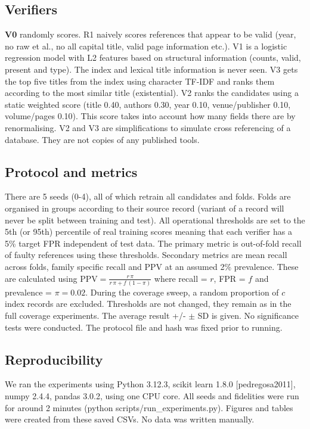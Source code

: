 \subsection{Verifiers}
\textbf{V0} randomly scores. R1 naively scores references that appear to be valid (year, no raw et al., no all capital title,
valid page information etc.). V1 is a logistic regression model with \NnFeat{} L2 features based on structural
information (counts, valid, present and type). The index and lexical title information is never seen. V3 gets the
top five titles from the index using character TF-IDF and ranks them according to the most similar title (existential). V2 ranks the
candidates using a static weighted score (title 0.40, authors 0.30, year 0.10, venue/publisher 0.10, volume/pages 0.10). This score takes
into account how many fields there are by renormalising. V2 and V3 are simplifications to simulate cross referencing of a database. They are
not copies of any published tools.

\subsection{Protocol and metrics}\label{sec:protocol}
There are 5 seeds (0-4), all of which retrain all candidates and folds. Folds are organised in groups according to their source
record (variant of a record will never be split between training and test). All operational thresholds are set to the 5th (or 95th)
percentile of real training scores meaning that each verifier has a 5\% target FPR independent of test data. The primary metric is
out-of-fold recall of faulty references using these thresholds. Secondary metrics are mean recall across folds, family specific
recall and PPV at an assumed 2\% prevalence. These are calculated using $\mathrm{PPV}=\frac{r\,\pi}{r\,\pi+f\,(1-\pi)}$ where recall = $r$,
FPR = $f$ and prevalence = $\pi{=}0.02$. During the coverage sweep, a random proportion of $c$
index records are excluded. Thresholds are not changed, they remain as in the full coverage experiments. The average result +/- $\pm$
SD is given. No significance tests were conducted. The protocol file and hash was fixed prior to running.

\subsection{Reproducibility}
We ran the experiments using Python 3.12.3, scikit learn 1.8.0 [pedregosa2011], numpy 2.4.4, pandas 3.0.2, using one CPU core. All seeds and fidelities were run for around 2 minutes (python scripts/run\_experiments.py). Figures and tables were created from these saved CSVs. No data was written manually.

